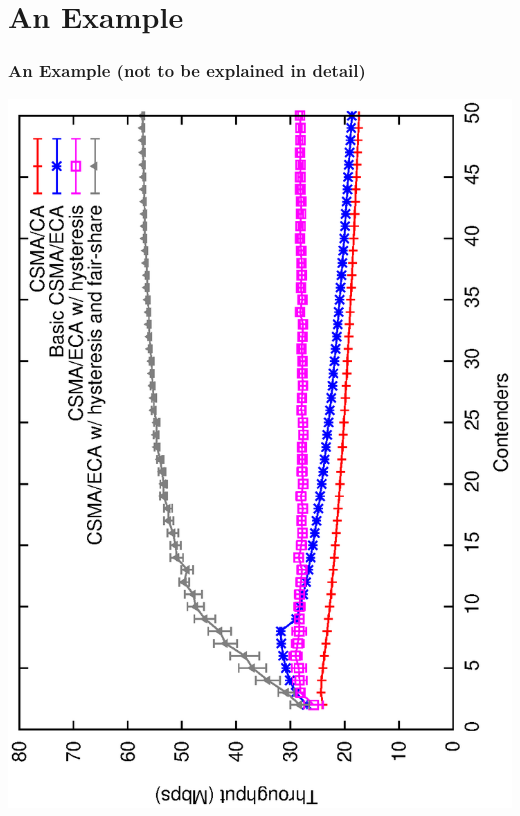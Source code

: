 \documentclass{beamer}
\begin{document}
\section{An Example}
\begin{frame}
  \frametitle{An Example (not to be explained in detail)}
      \begin{center}
        \includegraphics[angle=-90,width=\textwidth]{figures/throughput-combined}
      \end{center}
\end{frame}
\end{document}
